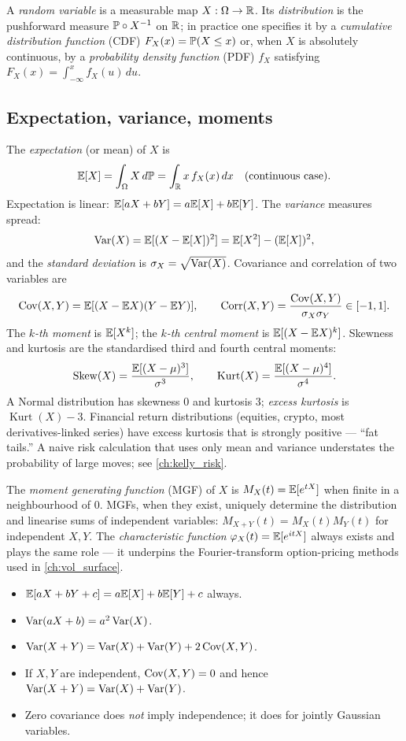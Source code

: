 A \emph{random variable} is a measurable map $X : \Omega \to \mathbb{R}$.
Its \emph{distribution} is the pushforward measure
$\mathbb{P} \circ X^{-1}$ on $\mathbb{R}$; in practice one specifies it by a
\emph{cumulative distribution function} (CDF) $F_X(x) = \mathbb{P}(X \le x)$
or, when $X$ is absolutely continuous, by a \emph{probability density
function} (PDF) $f_X$ satisfying $F_X(x) = \int_{-\infty}^x f_X(u)\,du$.

\subsection{Expectation, variance, moments}

The \emph{expectation} (or mean) of $X$ is
\[
\mathbb{E}[X] = \int_\Omega X \, d\mathbb{P}
      = \int_{\mathbb{R}} x \, f_X(x)\, dx \quad \text{(continuous case)}.
\]
Expectation is linear: $\mathbb{E}[aX + bY] = a\mathbb{E}[X] + b\mathbb{E}[Y]$. The
\emph{variance} measures spread:
\[
\operatorname{Var}(X) = \mathbb{E}[(X - \mathbb{E}[X])^2] = \mathbb{E}[X^2] - (\mathbb{E}[X])^2,
\]
and the \emph{standard deviation} is $\sigma_X = \sqrt{\operatorname{Var}(X)}$.
Covariance and correlation of two variables are
\[
\operatorname{Cov}(X,Y) = \mathbb{E}[(X - \mathbb{E} X)(Y - \mathbb{E} Y)], \qquad
\operatorname{Corr}(X,Y) = \frac{\operatorname{Cov}(X,Y)}{\sigma_X \sigma_Y} \in [-1,1].
\]
The \emph{$k$-th moment} is $\mathbb{E}[X^k]$; the \emph{$k$-th central moment}
is $\mathbb{E}[(X - \mathbb{E} X)^k]$. Skewness and kurtosis are the standardised third
and fourth central moments:
\[
\operatorname{Skew}(X) = \frac{\mathbb{E}[(X-\mu)^3]}{\sigma^3}, \qquad
\operatorname{Kurt}(X) = \frac{\mathbb{E}[(X-\mu)^4]}{\sigma^4}.
\]
A Normal distribution has skewness $0$ and kurtosis $3$; \emph{excess
kurtosis} is $\operatorname{Kurt}(X) - 3$. Financial return
distributions (equities, crypto, most derivatives-linked series) have
excess kurtosis that is strongly positive --- ``fat tails.'' A naive
risk calculation that uses only mean and variance understates the
probability of large moves; see \cref{ch:kelly_risk}.

The \emph{moment generating function} (MGF) of $X$ is
$M_X(t) = \mathbb{E}[e^{tX}]$ when finite in a neighbourhood of $0$. MGFs, when
they exist, uniquely determine the distribution and linearise sums of
independent variables: $M_{X+Y}(t) = M_X(t)M_Y(t)$ for independent
$X, Y$. The \emph{characteristic function} $\varphi_X(t) = \mathbb{E}[e^{itX}]$
always exists and plays the same role --- it underpins the
Fourier-transform option-pricing methods used in \cref{ch:vol_surface}.

\begin{keyfactbox}
\begin{itemize}
  \item $\mathbb{E}[aX + bY + c] = a\mathbb{E}[X] + b\mathbb{E}[Y] + c$ always.
  \item $\operatorname{Var}(aX + b) = a^2 \operatorname{Var}(X)$.
  \item $\operatorname{Var}(X + Y) = \operatorname{Var}(X) + \operatorname{Var}(Y) + 2\operatorname{Cov}(X,Y)$.
  \item If $X,Y$ are independent, $\operatorname{Cov}(X,Y) = 0$ and hence
        $\operatorname{Var}(X+Y) = \operatorname{Var}(X) + \operatorname{Var}(Y)$.
  \item Zero covariance does \emph{not} imply independence; it does for
        jointly Gaussian variables.
\end{itemize}
\end{keyfactbox}

